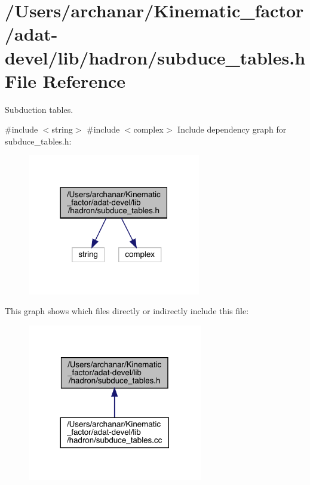 \hypertarget{adat-devel_2lib_2hadron_2subduce__tables_8h}{}\section{/\+Users/archanar/\+Kinematic\+\_\+factor/adat-\/devel/lib/hadron/subduce\+\_\+tables.h File Reference}
\label{adat-devel_2lib_2hadron_2subduce__tables_8h}


Subduction tables.  


{\ttfamily \#include $<$string$>$}\newline
{\ttfamily \#include $<$complex$>$}\newline
Include dependency graph for subduce\+\_\+tables.\+h\+:
\nopagebreak
\begin{figure}[H]
\begin{center}
\leavevmode
\includegraphics[width=214pt]{d8/daa/adat-devel_2lib_2hadron_2subduce__tables_8h__incl}
\end{center}
\end{figure}
This graph shows which files directly or indirectly include this file\+:
\nopagebreak
\begin{figure}[H]
\begin{center}
\leavevmode
\includegraphics[width=216pt]{d9/db6/adat-devel_2lib_2hadron_2subduce__tables_8h__dep__incl}
\end{center}
\end{figure}

